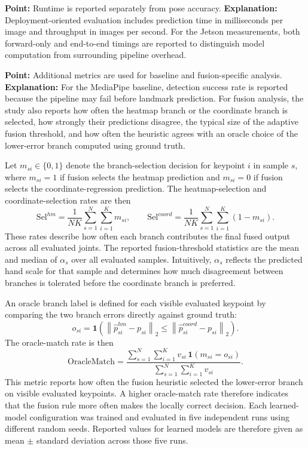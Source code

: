 \documentclass[10pt,letterpaper]{article}
\begin{document}
\medskip
\noindent\textbf{Point:} Runtime is reported separately from pose accuracy.  
\textbf{Explanation:} Deployment-oriented evaluation includes prediction time in milliseconds per image and throughput in images per second. For the Jetson measurements, both forward-only and end-to-end timings are reported to distinguish model computation from surrounding pipeline overhead.

\medskip
\noindent\textbf{Point:} Additional metrics are used for baseline and fusion-specific analysis.  
\textbf{Explanation:} For the MediaPipe baseline, detection success rate is reported because the pipeline may fail before landmark prediction. For fusion analysis, the study also reports how often the heatmap branch or the coordinate branch is selected, how strongly their predictions disagree, the typical size of the adaptive fusion threshold, and how often the heuristic agrees with an oracle choice of the lower-error branch computed using ground truth.

Let \(m_{si} \in \{0,1\}\) denote the branch-selection decision for keypoint \(i\) in sample \(s\), where \(m_{si}=1\) if fusion selects the heatmap prediction and \(m_{si}=0\) if fusion selects the coordinate-regression prediction. The heatmap-selection and coordinate-selection rates are then
\begin{equation}
\mathrm{Sel}^{hm} =
\frac{1}{NK}
\sum_{s=1}^{N}\sum_{i=1}^{K} m_{si},
\qquad
\mathrm{Sel}^{coord} =
\frac{1}{NK}
\sum_{s=1}^{N}\sum_{i=1}^{K} (1-m_{si}).
\label{eq:selection-rates}
\end{equation}
These rates describe how often each branch contributes the final fused output across all evaluated joints.
The reported fusion-threshold statistics are the mean and median of \(\alpha_s\) over all evaluated samples. Intuitively, \(\alpha_s\) reflects the predicted hand scale for that sample and determines how much disagreement between branches is tolerated before the coordinate branch is preferred.

An oracle branch label is defined for each visible evaluated keypoint by comparing the two branch errors directly against ground truth:
\begin{equation}
o_{si} =
\mathbf{1}
\left(
\left\|
\hat{p}^{hm}_{si} - p_{si}
\right\|_2
\le
\left\|
\hat{p}^{coord}_{si} - p_{si}
\right\|_2
\right).
\label{eq:oracle-label}
\end{equation}
The oracle-match rate is then
\begin{equation}
\mathrm{OracleMatch} =
\frac{
\sum_{s=1}^{N}\sum_{i=1}^{K}
v_{si}\,\mathbf{1}(m_{si}=o_{si})
}{
\sum_{s=1}^{N}\sum_{i=1}^{K} v_{si}
}.
\label{eq:oracle-match}
\end{equation}
This metric reports how often the fusion heuristic selected the lower-error branch on visible evaluated keypoints. A higher oracle-match rate therefore indicates that the fusion rule more often makes the locally correct decision.
Each learned-model configuration was trained and evaluated in five independent runs using different random seeds. Reported values for learned models are therefore given as mean \(\pm\) standard deviation across those five runs.
\end{document}
